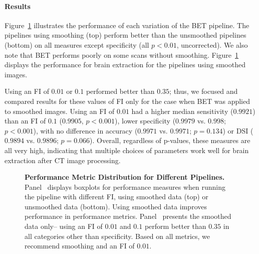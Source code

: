 \documentclass[10pt]{article}\usepackage[]{graphicx}\usepackage[]{color}
\begin{document}
\vspace{-0.4cm}
\paragraph*{Results}
Figure~\ref{fig:metrics}\protect{} illustrates the performance of each variation of the BET pipeline.  The pipelines using smoothing (top) perform better than the unsmoothed pipelines (bottom) on all measures except specificity (all $p < 0.01$, uncorrected).  We also note that BET performs poorly on some scans without smoothing.  Figure~\ref{fig:metrics}\protect{} displays the performance for brain extraction for the pipelines using smoothed images. 

Using an FI of $0.01$ or $0.1$ performed better than $0.35$; thus, we focused and compared results for these values of FI only for the case when BET was applied to smoothed images.  Using an FI of $0.01$ had a higher median sensitivity ($0.9921$) than an FI of $0.1$ ($0.9905$, $p< 0.001$), lower specificity ($0.9979$ vs. $0.998$; $p< 0.001$), with no difference in accuracy ($0.9971$ vs. $0.9971$; $p= 0.134$) or DSI ($0.9894$ vs. $0.9896$; $p= 0.066$).  Overall, regardless of p-values, these measures are all very high, indicating that multiple choices of parameters work well for brain extraction after CT image processing.

\vspace{-0.5cm}
\begin{figure}
\hfill
\caption{{\bf Performance Metric Distribution for Different Pipelines.} Panel~\protect{} displays boxplots for performance measures when running the pipeline with different FI, using smoothed data (top) or unsmoothed data (bottom).   Using smoothed data improves performance in performance metrics.  Panel~\protect{} presents the smoothed data only-- using an FI of $0.01$ and $0.1$ perform better than $0.35$ in all categories other than specificity. Based on all metrics, we recommend smoothing and an FI of $0.01$.}
\label{fig:metrics}
\end{figure}
\end{document}

